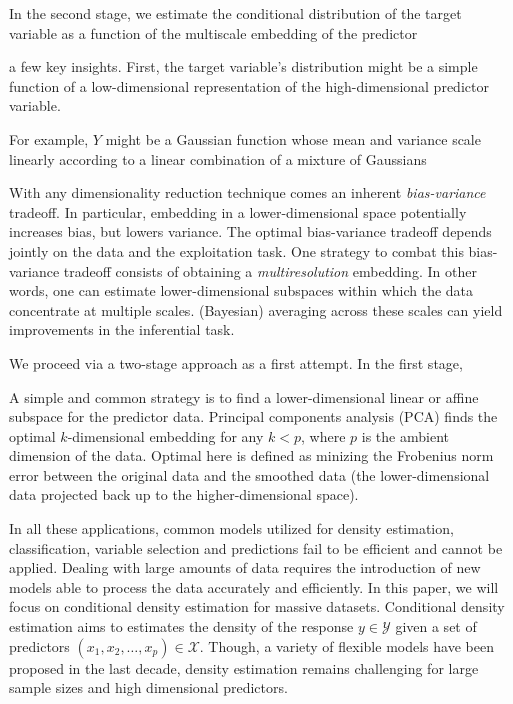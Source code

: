 \documentclass{article}
\begin{document}
In the second stage, we estimate the conditional distribution of the target variable as a function of the multiscale embedding of the predictor

a few key insights. First, the target variable's distribution might be a simple function of a low-dimensional representation of the high-dimensional predictor variable.  


For example, $Y$ might be a Gaussian function whose mean and variance scale linearly according to a linear combination of a mixture of Gaussians



With any dimensionality reduction technique comes an inherent \emph{bias-variance} tradeoff.  In particular, embedding in a lower-dimensional space potentially increases bias, but lowers variance.  The optimal bias-variance tradeoff depends jointly on the data and the exploitation task.  One strategy to combat this bias-variance tradeoff consists of obtaining a \emph{multiresolution} embedding.  In other words, one can estimate lower-dimensional subspaces within which the data concentrate at multiple scales.  (Bayesian) averaging across these scales can yield improvements in the inferential task.  


We proceed via a two-stage approach as a first attempt.  In the first stage, 


A simple and common strategy is to find a lower-dimensional linear or affine subspace for the predictor data.  Principal components analysis (PCA) \cite{Jolliffe} finds the optimal $k$-dimensional embedding for any $k < p$, where $p$ is the ambient dimension of the data.  Optimal here is defined as minizing the Frobenius norm error between the original data and the smoothed data (the lower-dimensional data projected back up to the higher-dimensional space).  




In all these applications, common models utilized for density estimation, classification, variable selection and predictions fail to be efficient and cannot be applied. 
Dealing with large amounts of data requires the introduction of new models able to process the data accurately and efficiently. 
In this paper, we will focus on conditional density estimation for massive datasets. Conditional density estimation aims to estimates the density of the response $y \in \mathcal{Y}$ given a set of predictors $(x_1, x_2, \ldots, x_p)\in \mathcal{X}$. Though, a variety of flexible models have been proposed in the last decade, density estimation remains challenging for large sample sizes and high dimensional predictors. 
\end{document}
